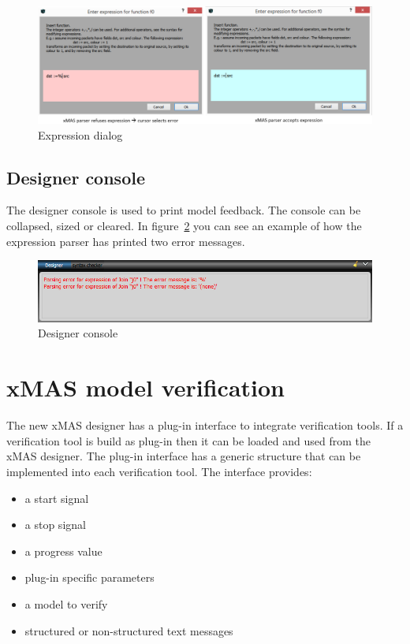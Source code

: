 \begin{figure}[here]
\begin{center}	
	\includegraphics[width=.90\linewidth]{pictures/expression-dialog}
	\caption{Expression dialog}
	\label{fig:expression-dialog}
\end{center}
\end{figure}



\subsection{Designer console}
The designer console is used to print model feedback. The console can be
collapsed, sized or cleared. In figure~\ref{fig:designer-console} you can see an
example of how the expression parser has printed two error messages.

\begin{figure}[here]
\begin{center}	
	\includegraphics[width=.70\linewidth]{pictures/designer-console}
	\caption{Designer console}
	\label{fig:designer-console}
\end{center}
\end{figure}


\section{xMAS model verification}

The new xMAS designer has a plug-in interface to integrate verification tools.
If a verification tool is build as plug-in then it can be loaded and used from
the xMAS designer. The plug-in interface has a generic structure that can be
implemented into each verification tool. The interface provides:
\begin{itemize}
\item a start signal
\item a stop signal
\item a progress value
\item plug-in specific parameters
\item a model to verify
\item structured or non-structured text messages
\end{itemize}

